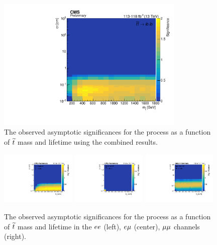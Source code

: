 \begin{figure}
\centering
\includegraphics[width=0.8\textwidth]{figures/results/significance_combined_lb.pdf}
\caption{The observed asymptotic significances for the \stoptolb process as a function of $\widetilde{t}$ mass and lifetime using the combined results.}
\label{significance_combined_lb}
\end{figure}

\begin{figure}
\centering
\includegraphics[width=0.32\textwidth]{figures/results/emu_lb_significance.pdf}
\includegraphics[width=0.32\textwidth]{figures/results/ee_lb_significance.pdf}
\includegraphics[width=0.32\textwidth]{figures/results/mumu_lb_significance.pdf}
\caption{The observed asymptotic significances for the \stoptolb process as a function of $\widetilde{t}$ mass and lifetime in the $ee$ (left), $e{\mu}$ (center), ${\mu}{\mu}$ channels (right).}
\label{significance_channels_lb}
\end{figure}